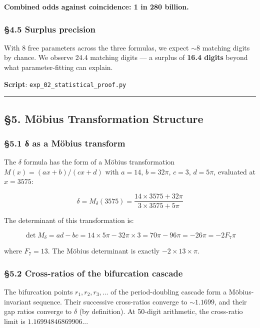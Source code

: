 \documentclass[
  11pt,
  a4paper]{article}
\begin{document}
\textbf{Combined odds against coincidence: 1 in 280 billion.}

\subsubsection{§4.5 Surplus precision}\label{surplus-precision}

With 8 free parameters across the three formulas, we expect \(\sim8\)
matching digits by chance. We observe 24.4 matching digits --- a surplus
of \textbf{16.4 digits} beyond what parameter-fitting can explain.

\textbf{Script}: \texttt{exp\_02\_statistical\_proof.py}

\begin{center}\rule{0.5\linewidth}{0.5pt}\end{center}

\subsection{§5. Möbius Transformation
Structure}\label{muxf6bius-transformation-structure}

\subsubsection{§5.1 δ as a Möbius
transform}\label{ux3b4-as-a-muxf6bius-transform}

The \(\delta\) formula has the form of a Möbius transformation
\(M(x) = (ax + b)/(cx + d)\) with \(a = 14\), \(b = 32\pi\), \(c = 3\),
\(d = 5\pi\), evaluated at \(x = 3575\):

\[\delta = M_\delta(3575) = \frac{14 \times 3575 + 32\pi}{3 \times 3575 + 5\pi}\]

The determinant of this transformation is:

\[\det M_\delta = ad - bc = 14 \times 5\pi - 32\pi \times 3 = 70\pi - 96\pi = -26\pi = -2 F_7 \pi\]

where \(F_7 = 13\). The Möbius determinant is exactly
\(-2 \times 13 \times \pi\).

\subsubsection{§5.2 Cross-ratios of the bifurcation
cascade}\label{cross-ratios-of-the-bifurcation-cascade}

The bifurcation points \(r_1, r_2, r_3, \ldots\) of the period-doubling
cascade form a Möbius-invariant sequence. Their successive cross-ratios
converge to \(\sim1.1699\), and their gap ratios converge to \(\delta\)
(by definition). At 50-digit arithmetic, the cross-ratio limit is
\(1.16994846869906...\)
\end{document}
